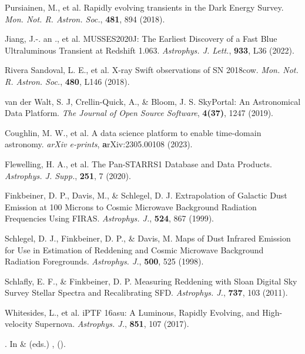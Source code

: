 \documentclass{nature_plusfigure}
\newcommand{\mn}{{Mon. Not. R. Astron. Soc.}}
\newcommand{\mnras}{\mn}
\newcommand{\apj}{{Astrophys. J.}}
\newcommand{\apjl}{{Astrophys. J. Lett.}}
\newcommand{\apjs}{{Astrophys. J. Supp.}}
\begin{document}
\begin{methods}
\begin{thebibliography}{10}
 Pursiainen, M., et al. Rapidly evolving transients in the Dark Energy Survey. \emph{\mnras}, \textbf{481}, 894 (2018). 

 Jiang, J.-. an ., et al. MUSSES2020J: The Earliest Discovery of a Fast Blue Ultraluminous Transient at Redshift 1.063. \emph{\apjl}, \textbf{933}, L36 (2022). 

  Rivera Sandoval, L. E., et al. X-ray Swift observations of SN 2018cow. \emph{\mnras}, \textbf{480}, L146 (2018). 



  van der Walt, S. J, Crellin-Quick, A., \& Bloom, J. S. SkyPortal: An Astronomical Data Platform. \emph{The Journal of Open Source Software}, \textbf{4(37)}, 1247 (2019). 

  Coughlin, M. W., et al. A data science platform to enable time-domain astronomy. \emph{arXiv e-prints}, \textbf arXiv:2305.00108 (2023). 


  Flewelling, H. A., et al. The Pan-STARRS1 Database and Data Products. \emph{\apjs}, \textbf{251}, 7 (2020). 

  Finkbeiner, D. P., Davis, M., \& Schlegel, D. J. Extrapolation of Galactic Dust Emission at 100 Microns to Cosmic Microwave Background Radiation Frequencies Using FIRAS. \emph{\apj}, \textbf{524}, 867 (1999). 
 
  Schlegel, D. J., Finkbeiner, D. P., \& Davis, M. Maps of Dust Infrared Emission for Use in Estimation of Reddening and Cosmic Microwave Background Radiation Foregrounds. \emph{\apj}, \textbf{500}, 525 (1998). 

  Schlafly, E. F., \& Finkbeiner, D. P. Measuring Reddening with Sloan Digital Sky Survey Stellar Spectra and Recalibrating SFD. \emph{\apj}, \textbf{737}, 103 (2011). 
 
  Whitesides, L., et al. iPTF 16asu: A Luminous, Rapidly Evolving, and High-velocity Supernova. \emph{\apj}, \textbf{851}, 107 (2017). 

\newblock {}.
\newblock In  \&  (eds.) \emph{},
   ().
 

\end{thebibliography}
\end{methods}
\end{document}
